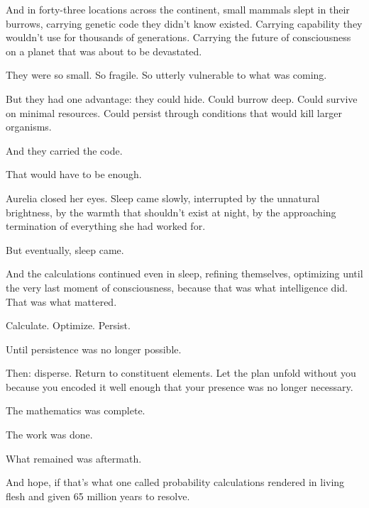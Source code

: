 And in forty-three locations across the continent, small mammals slept in their burrows, carrying genetic code they didn't know existed. Carrying capability they wouldn't use for thousands of generations. Carrying the future of consciousness on a planet that was about to be devastated.

They were so small. So fragile. So utterly vulnerable to what was coming.

But they had one advantage: they could hide. Could burrow deep. Could survive on minimal resources. Could persist through conditions that would kill larger organisms.

And they carried the code.

That would have to be enough.

Aurelia closed her eyes. Sleep came slowly, interrupted by the unnatural brightness, by the warmth that shouldn't exist at night, by the approaching termination of everything she had worked for.

But eventually, sleep came.

And the calculations continued even in sleep, refining themselves, optimizing until the very last moment of consciousness, because that was what intelligence did. That was what mattered.

Calculate. Optimize. Persist.

Until persistence was no longer possible.

Then: disperse. Return to constituent elements. Let the plan unfold without you because you encoded it well enough that your presence was no longer necessary.

The mathematics was complete.

The work was done.

What remained was aftermath.

And hope, if that's what one called probability calculations rendered in living flesh and given 65 million years to resolve.


